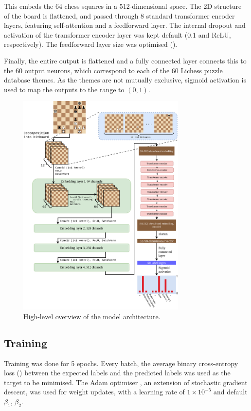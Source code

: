 This embeds the 64 chess squares in a 512-dimensional space. The 2D structure
of the board is flattened, and passed through 8 standard transformer encoder
\citep{attention} layers, featuring self-attention and a feedforward layer. The
internal dropout and activation of the transformer encoder layer was kept
default (0.1 and ReLU, respectively). The feedforward layer size was optimised
().

Finally, the entire output is flattened and a fully connected layer connects
this to the 60 output neurons, which correspond to each of the 60 Lichess
puzzle database themes. As the themes are not mutually exclusive, sigmoid
activation is used to map the outputs to the range to $(0, 1)$.


\begin{figure}[H]
  \centering
  \includegraphics[width=0.75\textwidth]{project/img/ml_diagram.png}
  \caption{High-level overview of the model architecture.}
  \label{MLDiagram}
\end{figure}

\subsection{Training}\label{mlS23}

Training was done for 5 epochs. Every batch, the average binary cross-entropy
loss () between the expected labels and the predicted labels was
used as the target to be minimised. The Adam optimiser \citep{kingma2014adam},
an extension of stochastic gradient descent, was used for weight updates, with
a learning rate of $1\times10^{-5}$ and default $\beta_1$, $\beta_2$.

